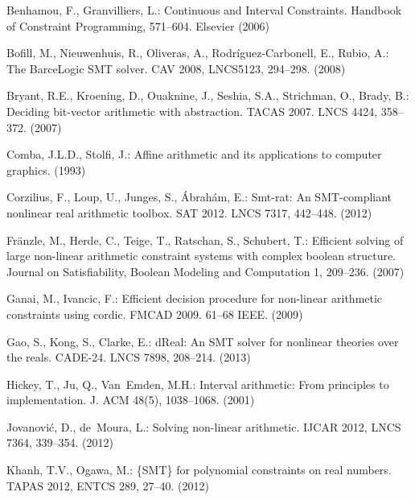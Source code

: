 \documentclass[runningheads,a4paper,oribibl]{llncs}
\begin{document}
\begin{thebibliography}{10}
\providecommand{\url}[1]{\texttt{#1}}
\providecommand{\urlprefix}{URL }


  Benhamou, F., Granvilliers, L.: {Continuous and Interval Constraints}.
  {Handbook of Constraint Programming}, 571--604. {Elsevier} (2006)

Bofill, M., Nieuwenhuis, R., Oliveras, A., Rodríguez-Carbonell, E., Rubio, A.:
The BarceLogic SMT solver.
CAV 2008, LNCS5123, 294--298. (2008)

Bryant, R.E., Kroening, D., Ouaknine, J., Seshia, S.A., Strichman, O., Brady,
B.: Deciding bit-vector arithmetic with abstraction.
TACAS 2007. 
LNCS 4424,  358--372. (2007)

Comba, J.L.D., Stolfi, J.: Affine arithmetic and its applications to computer
graphics. (1993)

  Corzilius, F., Loup, U., Junges, S., Ábrahám, E.: Smt-rat:
  An SMT-compliant nonlinear real arithmetic toolbox.
SAT 2012. LNCS 7317,  442--448. (2012)

Fränzle, M., Herde, C., Teige, T., Ratschan, S., Schubert, T.: Efficient
  solving of large non-linear arithmetic constraint systems with complex
  boolean structure. Journal on Satisfiability, Boolean Modeling and
  Computation  1,  209--236. (2007)

Ganai, M., Ivancic, F.: Efficient decision procedure for non-linear arithmetic
constraints using cordic.
FMCAD 2009.  61--68 {IEEE}. (2009)

  Gao, S., Kong, S., Clarke, E.:
  dReal: An SMT solver for nonlinear theories over the reals.
CADE-24. LNCS 7898,  208--214. (2013)

  Hickey, T., Ju, Q., Van~Emden, M.H.:
  Interval arithmetic: From principles to implementation.
  J. ACM  48(5),  1038--1068. (2001)

  Jovanović, D., de~Moura, L.: Solving non-linear arithmetic.
  IJCAR 2012, LNCS 7364,  339--354. (2012)

Khanh, T.V., Ogawa, M.: \{SMT\} for polynomial constraints on real numbers.
TAPAS 2012, ENTCS 289, 27--40. (2012)


\end{thebibliography}
\end{document}
